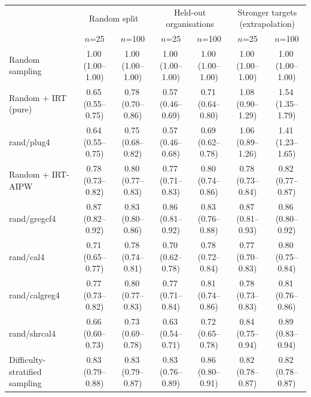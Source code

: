 \begin{tabular}{lcccccc}
\toprule
 & \multicolumn{2}{c}{Random split} & \multicolumn{2}{c}{Held-out organisations} & \multicolumn{2}{c}{Stronger targets (extrapolation)} \\
 & $n$=25 & $n$=100 & $n$=25 & $n$=100 & $n$=25 & $n$=100 \\
\midrule
Random sampling & 1.00\,\scriptsize(1.00--1.00) & 1.00\,\scriptsize(1.00--1.00) & 1.00\,\scriptsize(1.00--1.00) & 1.00\,\scriptsize(1.00--1.00) & 1.00\,\scriptsize(1.00--1.00) & 1.00\,\scriptsize(1.00--1.00) \\
Random + IRT (pure) & 0.65\,\scriptsize(0.55--0.75) & 0.78\,\scriptsize(0.70--0.86) & 0.57\,\scriptsize(0.46--0.69) & 0.71\,\scriptsize(0.64--0.80) & 1.08\,\scriptsize(0.90--1.29) & 1.54\,\scriptsize(1.35--1.79) \\
rand/plug4 & 0.64\,\scriptsize(0.55--0.75) & 0.75\,\scriptsize(0.68--0.82) & 0.57\,\scriptsize(0.46--0.68) & 0.69\,\scriptsize(0.62--0.78) & 1.06\,\scriptsize(0.89--1.26) & 1.41\,\scriptsize(1.23--1.65) \\
Random + IRT-AIPW & 0.78\,\scriptsize(0.73--0.82) & 0.80\,\scriptsize(0.77--0.83) & 0.77\,\scriptsize(0.71--0.83) & 0.80\,\scriptsize(0.74--0.86) & 0.78\,\scriptsize(0.73--0.84) & 0.82\,\scriptsize(0.77--0.87) \\
rand/gregcf4 & 0.87\,\scriptsize(0.82--0.92) & 0.83\,\scriptsize(0.80--0.86) & 0.86\,\scriptsize(0.81--0.92) & 0.83\,\scriptsize(0.76--0.88) & 0.87\,\scriptsize(0.81--0.93) & 0.86\,\scriptsize(0.80--0.92) \\
rand/cal4 & 0.71\,\scriptsize(0.65--0.77) & 0.78\,\scriptsize(0.74--0.81) & 0.70\,\scriptsize(0.62--0.78) & 0.78\,\scriptsize(0.72--0.84) & 0.77\,\scriptsize(0.70--0.83) & 0.80\,\scriptsize(0.75--0.84) \\
rand/calgreg4 & 0.77\,\scriptsize(0.73--0.82) & 0.80\,\scriptsize(0.77--0.83) & 0.77\,\scriptsize(0.71--0.84) & 0.81\,\scriptsize(0.74--0.86) & 0.78\,\scriptsize(0.73--0.83) & 0.81\,\scriptsize(0.76--0.86) \\
rand/shrcal4 & 0.66\,\scriptsize(0.60--0.73) & 0.73\,\scriptsize(0.69--0.78) & 0.63\,\scriptsize(0.54--0.71) & 0.72\,\scriptsize(0.65--0.78) & 0.84\,\scriptsize(0.75--0.94) & 0.89\,\scriptsize(0.83--0.94) \\
Difficulty-stratified sampling & 0.83\,\scriptsize(0.79--0.88) & 0.83\,\scriptsize(0.79--0.87) & 0.83\,\scriptsize(0.76--0.89) & 0.86\,\scriptsize(0.80--0.91) & 0.82\,\scriptsize(0.78--0.87) & 0.82\,\scriptsize(0.78--0.87) \\

\end{tabular}
